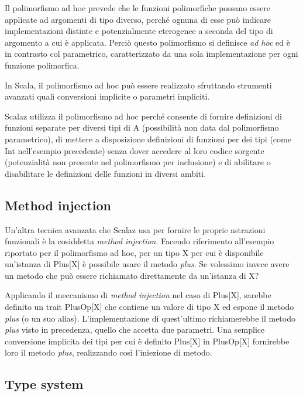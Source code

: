 \begin{itemize}
Il polimorfismo ad hoc prevede che le funzioni polimorfiche possano essere applicate ad argomenti di tipo diverso, perché ognuna di esse può indicare implementazioni distinte e potenzialmente eterogenee a seconda del tipo di argomento a cui è applicata. Perciò questo polimorfismo si definisce \textit{ad hoc} ed è in contrasto col parametrico, caratterizzato da una sola implementazione per ogni funzione polimorfica.

In Scala, il polimorfismo ad hoc può essere realizzato sfruttando strumenti avanzati quali conversioni implicite o parametri impliciti.


\end{itemize}

Scalaz utilizza il polimorfismo ad hoc perché consente di fornire definizioni di funzioni separate per diversi tipi di A (possibilità non data dal polimorfismo parametrico), di mettere a disposizione definizioni di funzioni per dei tipi (come Int nell'esempio precedente) senza dover accedere al loro codice sorgente (potenzialità non presente nel polimorfismo per inclusione) e di abilitare o disabilitare le definizioni delle funzioni in diversi ambiti.

\subsection{Method injection}

Un'altra tecnica avanzata che Scalaz usa per fornire le proprie astrazioni funzionali è la cosiddetta \textit{method injection}. Facendo riferimento all'esempio riportato per il polimorfismo ad hoc, per un tipo X per cui è disponibile un'istanza di Plus[X] è possibile usare il metodo \textit{plus}. Se volessimo invece avere un metodo che può essere richiamato direttamente da un'istanza di X?

Applicando il meccanismo di \textit{method injection} nel caso di Plus[X], sarebbe definito un trait PlusOp[X] che contiene un valore di tipo X ed espone il metodo \textit{plus} (o un suo alias). L'implementazione di quest'ultimo richiamerebbe il metodo \textit{plus} visto in precedenza, quello che accetta due parametri. Una semplice conversione implicita dei tipi per cui è definito Plus[X] in PlusOp[X] fornirebbe loro il metodo \textit{plus}, realizzando così l'iniezione di metodo.

\subsection{Type system}

